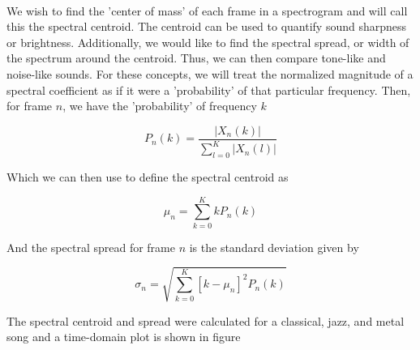 \documentclass[11pt,a4paper]{article}
\begin{document}
\paragraph*{} We wish to find the 'center of mass' of each frame in a spectrogram and will call this the spectral centroid. The centroid can be used to quantify sound sharpness or brightness. Additionally, we would like to find the spectral spread, or width of the spectrum around the centroid. Thus, we can then compare tone-like and noise-like sounds. For these concepts, we will treat the normalized magnitude of a spectral coefficient as if it were a 'probability' of that particular frequency. Then, for frame $n$, we have the 'probability' of frequency $k$

\begin{equation}
P_n(k) = \frac{|X_n(k)|}{\sum_{l=0}^{K} |X_n(l)|}
\end{equation}

Which we can then use to define the spectral centroid as

\begin{equation}
\mu_n = \sum_{k=0}^{K} kP_n(k)
\end{equation}

And the spectral spread for frame $n$ is the standard deviation given by

\begin{equation}
\sigma_n = \sqrt{\sum_{k=0}^{K} [k-\mu_n]^2 P_n(k)}
\end{equation}

The spectral centroid and spread were calculated for a classical, jazz, and metal song and a time-domain plot is shown in figure %

\pagebreak
\end{document}
